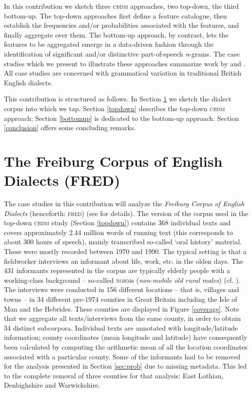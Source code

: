 \documentclass[output=paper]{LSP/langsci}
\begin{document}
In this contribution we sketch three \textsc{cbdm} approaches, two top-down, the third bottom-up. The top-down approaches first define a feature catalogue, then establish the frequencies and/or probabilities associated with the features, and finally aggregate over them. The bottom-up approach, by contrast, lets the features to be aggregated emerge in a data-driven fashion through the identification of significant and/or distinctive part-of-speech \emph{n}-grams. The case studies which we present to illustrate these approaches summarize work by \citet{szmrecsanyi_grammatical_2013} and \citet{wolk_integrating_2014}. All case studies are concerned with grammatical variation in traditional British English dialects.

This contribution is structured as follows. In Section \ref{FRED} we sketch the dialect corpus into which we tap. Section \ref{topdown} describes the top-down \textsc{cbdm} approach; Section \ref{bottomup} is dedicated to the bottom-up approach. Section \ref{conclusion} offers some concluding remarks.


\section{The Freiburg Corpus of English Dialects (FRED)}\label{FRED}

The case studies in this contribution will analyze the \emph{Freiburg Corpus of English Dialects} (henceforth: \textsc{fred}) (see \citealt{hernandez_users_2006} for details). 
The version of the corpus used in the top-down \textsc{cbdm} study (Section \ref{topdown}) contains 368 individual texts and covers approximately 2.44 million words of running text (this corresponds to about 300 hours of speech), mainly transcribed so-called `oral history' material. 
These were mostly recorded between 1970 and 1990. 
The typical setting is that a fieldworker interviews an informant about life, work, etc. in the olden days. 
The 431 informants represented in the corpus are typically elderly people with a working-class background -- so-called \textsc{norm}s (\emph{non-mobile old rural males}) (cf. \citealt[29]{chambers_dialectology_1998}). 
The interviews were conducted in 156 different locations -- that is, villages and towns -- in 34 different pre-1974 counties in Great Britain including the Isle of Man and the Hebrides. These counties are displayed in Figure \ref{coverage}. 
Note that we aggregate all texts/interviews from the same county, in order to obtain 34 distinct subcorpora.
Individual texts are annotated with longitude/latitude information; county coordinates (mean longitude and latitude) have consequently been calculated by computing the arithmetic mean of all the location coordinates associated with a particular county. 
Some of the informants had to be removed for the analysis presented in Section \ref{sec:prob} due to missing metadata.
This led to the complete removal of three counties for that analysis: East Lothian, Denbighshire and Warwickshire.
\end{document}
